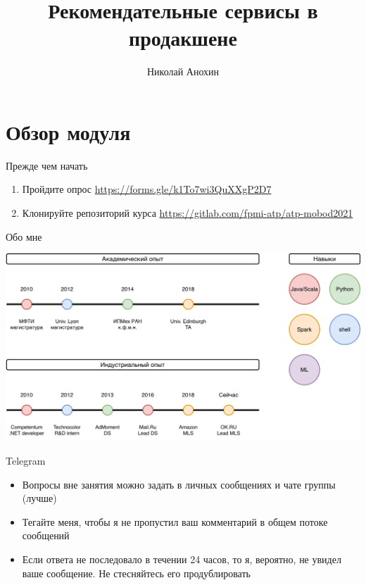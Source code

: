 \documentclass[11pt,aspectratio=169]{beamer}
\author{Николай Анохин}
\title{Рекомендательные сервисы в продакшене}
\begin{document}
{

\begin{frame}
\titlepage
\end{frame}


}

\section{Обзор модуля}

\begin{frame}{Прежде чем начать}

\begin{enumerate}
\item Пройдите опрос \url{https://forms.gle/k1To7wi3QuXXgP2D7}
\item Клонируйте репозиторий курса \url{https://gitlab.com/fpmi-atp/atp-mobod2021}
\end{enumerate}

\end{frame}

\begin{frame}{Обо мне}

\begin{center}
\includegraphics[scale=0.23]{images/about-me.png}
\end{center}

\end{frame}

\begin{frame}{Telegram}

\begin{itemize}
\item Вопросы вне занятия можно задать в личных сообщениях и чате группы (лучше)
\item Тегайте меня, чтобы я не пропустил ваш комментарий в общем потоке сообщений
\item Если ответа не последовало в течении 24 часов, то я, вероятно, не увидел ваше сообщение. Не стесняйтесь его продублировать
\end{itemize}

\end{frame}
\end{document}
